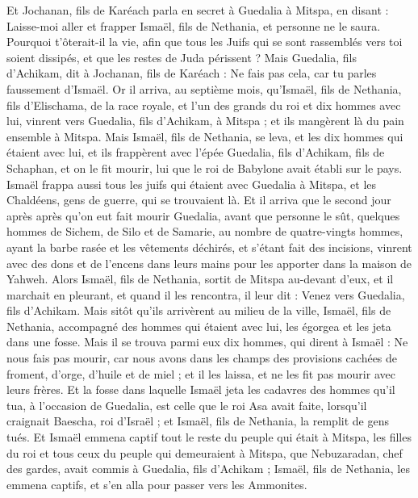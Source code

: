 \begin{multicols}{2}
Et Jochanan, fils de Karéach parla en secret à Guedalia à Mitspa, en disant : Laisse-moi aller et frapper Ismaël, fils de Nethania, et personne ne le saura. Pourquoi t'ôterait-il la vie, afin que tous les Juifs qui se sont rassemblés vers toi soient dissipés, et que les restes de Juda périssent ?
Mais Guedalia, fils d'Achikam, dit à Jochanan, fils de Karéach : Ne fais pas cela, car tu parles faussement d'Ismaël.
\VerseOne{}Or il arriva, au septième mois, qu'Ismaël, fils de Nethania, fils d'Elischama, de la race royale, et l'un des grands du roi et dix hommes avec lui, vinrent vers Guedalia, fils d'Achikam, à Mitspa ; et ils mangèrent là du pain ensemble à Mitspa.
Mais Ismaël, fils de Nethania, se leva, et les dix hommes qui étaient avec lui, et ils frappèrent avec l'épée Guedalia, fils d'Achikam, fils de Schaphan, et on le fit mourir, lui que le roi de Babylone avait établi sur le pays.
Ismaël frappa aussi tous les juifs qui étaient avec Guedalia à Mitspa, et les Chaldéens, gens de guerre, qui se trouvaient là.
Et il arriva que le second jour après après qu'on eut fait mourir Guedalia, avant que personne le sût,
quelques hommes de Sichem, de Silo et de Samarie, au nombre de quatre-vingts hommes, ayant la barbe rasée et les vêtements déchirés, et s'étant fait des incisions, vinrent avec des dons et de l'encens dans leurs mains pour les apporter dans la maison de Yahweh.
Alors Ismaël, fils de Nethania, sortit de Mitspa au-devant d'eux, et il marchait en pleurant, et quand il les rencontra, il leur dit : Venez vers Guedalia, fils d'Achikam.
Mais sitôt qu'ils arrivèrent au milieu de la ville, Ismaël, fils de Nethania, accompagné des hommes qui étaient avec lui, les égorgea et les jeta dans une fosse.
Mais il se trouva parmi eux dix hommes, qui dirent à Ismaël : Ne nous fais pas mourir, car nous avons dans les champs des provisions cachées de froment, d'orge, d'huile et de miel ; et il les laissa, et ne les fit pas mourir avec leurs frères.
 Et la fosse dans laquelle Ismaël jeta les cadavres des hommes qu'il tua, à l'occasion de Guedalia, est celle que le roi Asa avait faite, lorsqu'il craignait Baescha, roi d'Israël ; et Ismaël, fils de Nethania, la remplit de gens tués.
Et Ismaël emmena captif tout le reste du peuple qui était à Mitspa, les filles du roi et tous ceux du peuple qui demeuraient à Mitspa, que Nebuzaradan, chef des gardes, avait commis à Guedalia, fils d'Achikam ; Ismaël, fils de Nethania, les emmena captifs, et s'en alla pour passer vers les Ammonites.

\end{multicols}
